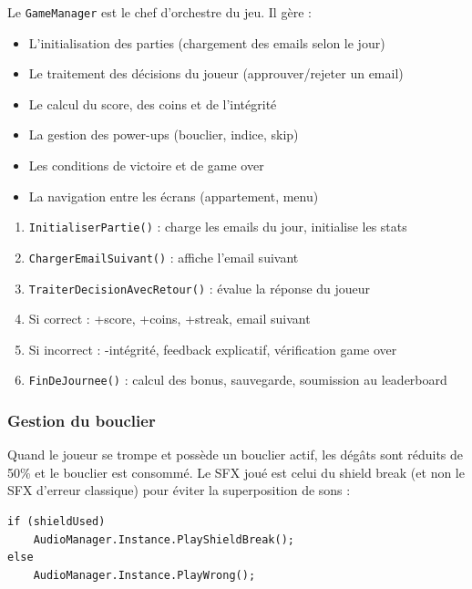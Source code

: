 \documentclass[12pt,a4paper]{article}
\begin{document}
Le \texttt{GameManager} est le chef d'orchestre du jeu. Il gère :

\begin{itemize}
    \item L'initialisation des parties (chargement des emails selon le jour)
    \item Le traitement des décisions du joueur (approuver/rejeter un email)
    \item Le calcul du score, des coins et de l'intégrité
    \item La gestion des power-ups (bouclier, indice, skip)
    \item Les conditions de victoire et de game over
    \item La navigation entre les écrans (appartement, menu)
\end{itemize}

\begin{tcolorbox}[title=Flux de jeu principal]
\begin{enumerate}
    \item \texttt{InitialiserPartie()} : charge les emails du jour, initialise les stats
    \item \texttt{ChargerEmailSuivant()} : affiche l'email suivant
    \item \texttt{TraiterDecisionAvecRetour()} : évalue la réponse du joueur
    \item Si correct : +score, +coins, +streak, email suivant
    \item Si incorrect : -intégrité, feedback explicatif, vérification game over
    \item \texttt{FinDeJournee()} : calcul des bonus, sauvegarde, soumission au leaderboard
\end{enumerate}
\end{tcolorbox}

\subsubsection{Gestion du bouclier}
Quand le joueur se trompe et possède un bouclier actif, les dégâts sont réduits de 50\% et le bouclier est consommé. Le SFX joué est celui du shield break (et non le SFX d'erreur classique) pour éviter la superposition de sons :

\begin{lstlisting}
if (shieldUsed)
    AudioManager.Instance.PlayShieldBreak();
else
    AudioManager.Instance.PlayWrong();
\end{lstlisting}
\end{document}
